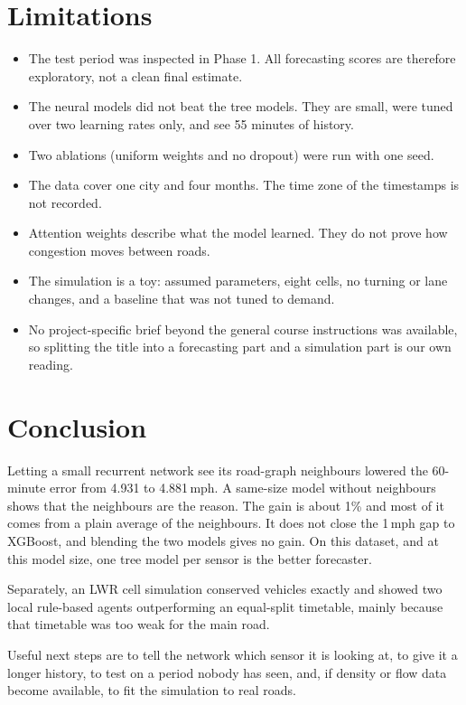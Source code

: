 \documentclass[conference]{IEEEtran}
\begin{document}
\section{Limitations}
\begin{itemize}
\item The test period was inspected in Phase 1. All forecasting scores are therefore exploratory, not a clean final estimate.
\item The neural models did not beat the tree models. They are small, were tuned over two learning rates only, and see 55 minutes of history.
\item Two ablations (uniform weights and no dropout) were run with one seed.
\item The data cover one city and four months. The time zone of the timestamps is not recorded.
\item Attention weights describe what the model learned. They do not prove how congestion moves between roads.
\item The simulation is a toy: assumed parameters, eight cells, no turning or lane changes, and a baseline that was not tuned to demand.
\item No project-specific brief beyond the general course instructions was available, so splitting the title into a forecasting part and a simulation part is our own reading.
\end{itemize}

\section{Conclusion}
Letting a small recurrent network see its road-graph neighbours lowered the 60-minute error from 4.931 to 4.881\,mph. A same-size model without neighbours shows that the neighbours are the reason. The gain is about 1\% and most of it comes from a plain average of the neighbours. It does not close the 1\,mph gap to XGBoost, and blending the two models gives no gain. On this dataset, and at this model size, one tree model per sensor is the better forecaster.

Separately, an LWR cell simulation conserved vehicles exactly and showed two local rule-based agents outperforming an equal-split timetable, mainly because that timetable was too weak for the main road.

Useful next steps are to tell the network which sensor it is looking at, to give it a longer history, to test on a period nobody has seen, and, if density or flow data become available, to fit the simulation to real roads.
\end{document}
